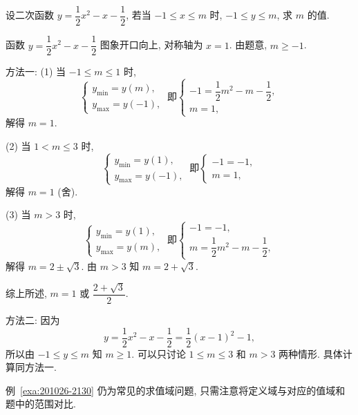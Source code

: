 \begin{example}\label{exa:201026-2130}
  设二次函数 $y=\dfrac12 x^2-x-\dfrac12$, 若当 $-1\leqslant x\leqslant m$ 时, $-1\leqslant y\leqslant m$, 求 $m$ 的值.
\end{example}
\begin{solution}
  函数 $y=\dfrac12 x^2-x-\dfrac12$ 图象开口向上, 对称轴为 $x=1$. 由题意, $m\geqslant -1$.
  
  方法一: (1) 当 $-1\leqslant m\leqslant 1$ 时, 
  \[\left\{\!\!\begin{array}{l}
    y_{\min}= y(m),\\
    y_{\max}= y(-1),
    \end{array}\right.\ \text{即}
    \left\{\!\!\begin{array}{l}
    -1= \dfrac12 m^2-m-\dfrac12,\\
    m= 1,
    \end{array}\right.\]
  解得 $m=1$.
  
  (2) 当 $1< m\leqslant 3$ 时, 
  \[\left\{\!\!\begin{array}{l}
    y_{\min}= y(1),\\
    y_{\max}= y(-1),
    \end{array}\right.\ \text{即}
    \left\{\!\!\begin{array}{l}
    -1= -1,\\
    m= 1,
    \end{array}\right.\]
  解得 $m=1$ (舍).
  
  (3) 当 $m>3$ 时, 
  \[\left\{\!\!\begin{array}{l}
    y_{\min}= y(1),\\
    y_{\max}= y(m),
    \end{array}\right.\ \text{即}
    \left\{\!\!\begin{array}{l}
    -1= -1,\\
    m= \dfrac12 m^2-m-\dfrac12,
    \end{array}\right.\]
  解得 $m=2\pm\sqrt3$. 由 $m>3$ 知 $m=2+\sqrt3$.
  
  综上所述, $m=1$ 或 $\dfrac{2+\sqrt3}2$.
  
  方法二: 因为 
  \[y=\frac12 x^2-x-\frac12= \frac12(x-1)^2-1,\]
  所以由 $-1\leqslant y\leqslant m$ 知 $m\geqslant 1$. 可以只讨论 $1\leqslant m\leqslant 3$ 和 $m>3$ 两种情形. 具体计算同方法一.
\end{solution}

例~\ref{exa:201026-2130} 仍为常见的求值域问题, 只需注意将定义域与对应的值域和题中的范围对比. 
